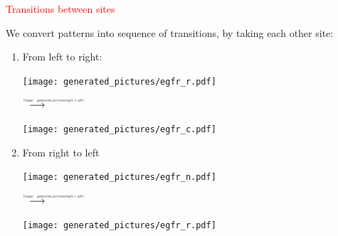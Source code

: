\documentclass[landscape,20pt]{transparents2e}
\newcommand{\red}{\textcolor{red}}
\renewcommand{\frametitle}[1]{\red{\HUGE #1 }}
\begin{document}
\begin{slide}{\frametitle{Transitions between sites}}

\vfill

We convert patterns into sequence of transitions, by taking each other site:\bigskip\\ 


\begin{minipage}{\linewidth}
\begin{center}
\end{center}
\end{minipage}

\vfill

\begin{enumerate}
  \item From left to right:

\hspace*{5cm}\texttt{[image: generated\_pictures/egfr\_r.pdf]}
\begin{minipage}{1cm}\vspace*{-2cm}$\stackrel{\begin{minipage}{1cm}\scalebox{0.3}{\texttt{[image: generated\_pictures/egfr\_r.pdf]}}\end{minipage}}{\longrightarrow}$\end{minipage} \texttt{[image: generated\_pictures/egfr\_c.pdf]}

\vfill

  \item From right to left

  \hspace*{5cm}\texttt{[image: generated\_pictures/egfr\_n.pdf]}
  \begin{minipage}{1cm}\vspace*{-2cm}$\stackrel{\begin{minipage}{1cm}\scalebox{0.3}{\texttt{[image: generated\_pictures/egfr\_c.pdf]}}\end{minipage}}{\longrightarrow}$\end{minipage} \texttt{[image: generated\_pictures/egfr\_r.pdf]}

\end{enumerate}
\end{slide}
\end{document}
